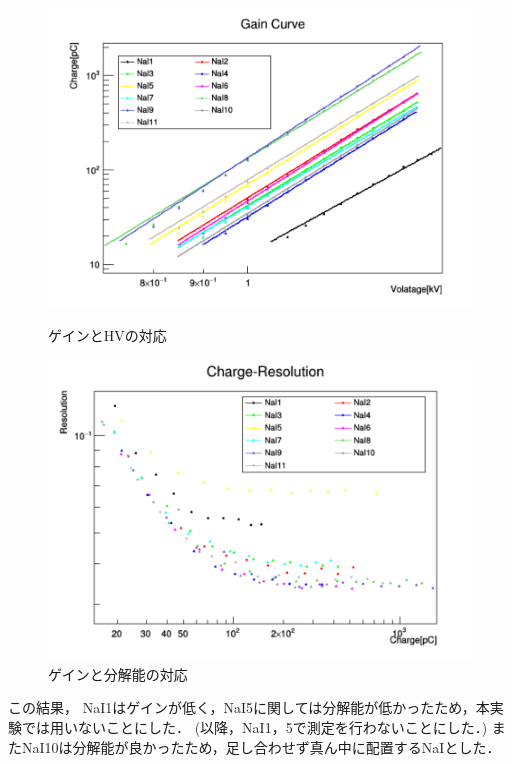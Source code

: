 \begin{figure}[H]
  \begin{minipage}{0.45\hsize}
    \begin{center}\hspace*{-1em}
      \includegraphics[width=1.1\textwidth]{figure/tajima/gain_curve.png}
    \end{center}
    \caption{ゲインとHVの対応}
    \label{GainHV}
  \end{minipage}
  \hfill
  \begin{minipage}{0.45\hsize}
    \begin{center}
      \includegraphics[width=1.1\textwidth]{figure/tajima/charge_resolution.png}
    \end{center}
    \caption{ゲインと分解能の対応}
    \label{resoHV}
  \end{minipage}
\end{figure}
この結果， NaI1はゲインが低く，NaI5に関しては分解能が低かったため，本実験では用いないことにした．
(以降，NaI1，5で測定を行わないことにした．)
またNaI10は分解能が良かったため，足し合わせず真ん中に配置するNaIとした．

